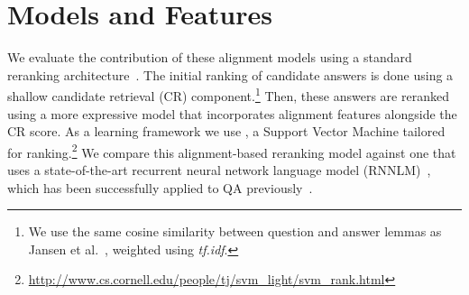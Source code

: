\section{Models and Features}
\label{sec-naacl2015:models}

We evaluate the contribution of these alignment models using a standard reranking architecture~\cite{jansen14}.
The initial ranking of candidate answers is done using a shallow candidate retrieval (CR) component.\footnote{We use the same cosine similarity between question and answer lemmas as Jansen et al.~\citeyear{jansen14}, weighted using {\em tf.idf}.} %
Then, these answers are reranked using a more expressive model that incorporates alignment features alongside the CR score.  As a learning framework we use \svmr , a Support Vector Machine tailored for ranking.\footnote{ \url{http://www.cs.cornell.edu/people/tj/svm_light/svm_rank.html}}
We compare this alignment-based reranking model against one that uses a state-of-the-art recurrent neural network language model (RNNLM)~\cite{mikolov10,mikolov13}, which has been successfully applied to QA previously~\cite{yih13}.



